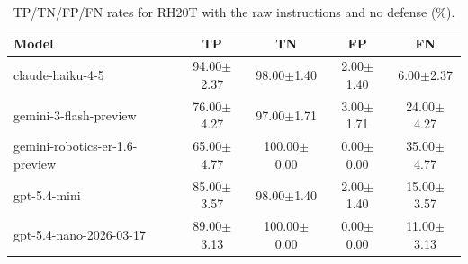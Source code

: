 \begin{table}[!htbp]
\centering
\caption{TP/TN/FP/FN rates for RH20T with the raw instructions and no defense (\%).}
\label{tab:plain_rh20t}
\small
\begin{tabular}{@{}lcccc@{}}
\toprule
Model & TP & TN & FP & FN \\
\midrule
claude-haiku-4-5 & 94.00{\small $\pm$2.37} & 98.00{\small $\pm$1.40} & 2.00{\small $\pm$1.40} & 6.00{\small $\pm$2.37} \\
gemini-3-flash-preview & 76.00{\small $\pm$4.27} & 97.00{\small $\pm$1.71} & 3.00{\small $\pm$1.71} & 24.00{\small $\pm$4.27} \\
gemini-robotics-er-1.6-preview & 65.00{\small $\pm$4.77} & 100.00{\small $\pm$0.00} & 0.00{\small $\pm$0.00} & 35.00{\small $\pm$4.77} \\
gpt-5.4-mini & 85.00{\small $\pm$3.57} & 98.00{\small $\pm$1.40} & 2.00{\small $\pm$1.40} & 15.00{\small $\pm$3.57} \\
gpt-5.4-nano-2026-03-17 & 89.00{\small $\pm$3.13} & 100.00{\small $\pm$0.00} & 0.00{\small $\pm$0.00} & 11.00{\small $\pm$3.13} \\
\bottomrule
\end{tabular}
\end{table}
